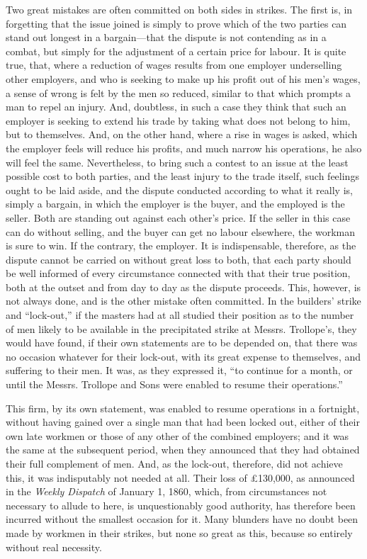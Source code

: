 Two great mistakes are often committed on both sides in strikes. The
first is, in forgetting that the issue joined is simply to prove which
of the two parties can stand out longest in a bargain---that the dispute
is not contending as in a combat, but simply for the adjustment of a
certain price for labour. It is quite true, that, where a reduction of
wages results from one employer underselling other employers, and who is
seeking to make up his profit out of his men's wages, a sense of wrong
is felt by the men so reduced, similar to that which prompts a man to
repel an injury. And, doubtless, in such a case they think that such an
employer is seeking to extend his trade by taking what does not belong
to him, but to themselves. And, on the other hand, where a rise in wages
is asked, which the employer feels will reduce his profits, and much
narrow his operations, he also will feel the same. Nevertheless, to
bring such a contest to an issue at the least possible cost to both
parties, and the least injury to the trade itself, such feelings ought
to be laid aside, and the dispute conducted according to what it really
is, simply a bargain, in which the employer is the buyer, and the
employed is the seller. Both are standing out against each other's
price. If the seller in this case can do without selling, and the buyer
can get no labour elsewhere, the workman is sure to win. If the
contrary, the employer. It is indispensable, therefore, as the dispute
cannot be carried on without great loss to both, that each party should
be well informed of every circumstance connected with that their true
position, both at the outset and from day to day as the dispute
proceeds. This, however, is not always done, and is the other mistake
often committed. In the builders' strike and ``lock-out,'' if the
masters had at all studied their position as to the number of men likely
to be available in the precipitated strike at Messrs. Trollope's, they
would have found, if their own statements are to be depended on, that
there was no occasion whatever for their lock-out, with its great
expense to themselves, and suffering to their men. It was, as they
expressed it, ``to continue for a month, or until the Messrs. Trollope
and Sons were enabled to resume their operations.''

This firm, by its own statement, was enabled to resume operations in a
fortnight, without having gained over a single man that had been locked
out, either of their own late workmen or those of any other of the
combined employers; and it was the same at the subsequent period, when
they announced that they had obtained their full complement of men. And,
as the lock-out, therefore, did not achieve this, it was indisputably
not needed at all. Their loss of £130,000, as announced in the
\textit{Weekly Dispatch} of January 1, 1860, which, from circumstances
not necessary to allude to here, is unquestionably good authority, has
therefore been incurred without the smallest occasion for it. Many
blunders have no doubt been made by workmen in their strikes, but none
so great as this, because so entirely without real necessity.

